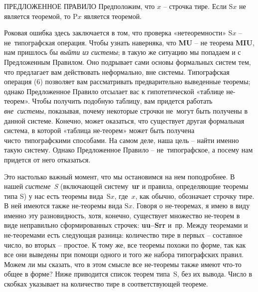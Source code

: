 \documentclass[../main.tex]{subfiles}
\begin{document}
\begin{mybox}{ПРЕДЛОЖЕННОЕ ПРАВИЛО}
    Предположим, что $x$ \--- строчка тире.
    Если S$x$ не является теоремой, то P$x$ является теоремой.
\end{mybox}

Роковая ошибка здесь заключается в том, что проверка «нетеоремности» S$x$ \--- не~типографская операция.
Чтобы узнать наверняка, что \textbf{MU} \--- не теорема \textbf{MIU}, нам пришлось бы \emph{выйти из системы}; в такую же ситуацию мы попадаем и с Предложенным Правилом.
Оно подрывает сами основы формальных систем тем, что предлагает вам действовать неформально, вне системы.
Типографская операция (6) позволяет вам рассматривать предварительно выведенные теоремы; однако Предложенное Правило отсылает вас к гипотетической «таблице не-теорем».
Чтобы получить подобную таблицу, вам придется работать \emph{вне~системы}, показывая, почему некоторые строчки не~могут быть получены в данной системе.
Конечно, может оказаться, что существует другая формальная система, в которой «таблица не-теорем» может быть получена чисто~типографскими способами.
На самом деле, наша цель \--- найти именно такую систему.
Однако Предложенное Правило \--- не~типографское, а посему нам придется от него отказаться.

Это настолько важный момент, что мы остановимся на нем поподробнее.
В нашей \emph{системе~S} (включающей систему~\textbf{ur} и правила, определяющие теоремы типа S) у нас есть теоремы вида~S$x$, где~$x$, как обычно, обозначает строчку тире.
В ней имеются также не-теоремы вида S$x$.
Говоря о не-теоремах, я имею в виду именно эту разновидность, хотя, конечно, существует множество не-теорем в виде неправильно сформированных строчек: \textbf{uu--Srr} и~пр.
Между теоремами и не-теоремами есть следующая разница: количество тире в первых \--- составное число, во вторых \--- простое.
К тому же, все теоремы похожи по форме, так как все они выведены при помощи одного и того же набора типографских правил.
Можем ли мы сказать, что в этом смысле все не-теоремы также имеют что-то общее в форме?
Ниже приводится список теорем типа~S, без их вывода.
Число в скобках указывает на количество тире в соответствующей теореме.
\end{document}
